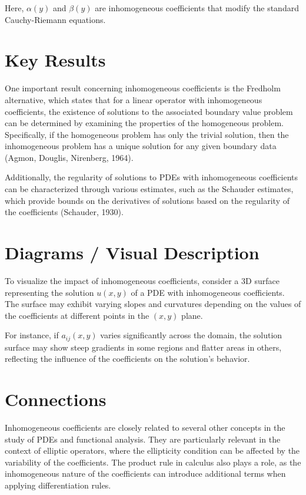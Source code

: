 \documentclass[11pt,a4paper]{article}
\begin{document}
Here, $\alpha(y)$ and $\beta(y)$ are inhomogeneous coefficients that modify the standard Cauchy-Riemann equations.

\section{Key Results}
One important result concerning inhomogeneous coefficients is the Fredholm alternative, which states that for a linear operator with inhomogeneous coefficients, the existence of solutions to the associated boundary value problem can be determined by examining the properties of the homogeneous problem. Specifically, if the homogeneous problem has only the trivial solution, then the inhomogeneous problem has a unique solution for any given boundary data (Agmon, Douglis, Nirenberg, 1964).

Additionally, the regularity of solutions to PDEs with inhomogeneous coefficients can be characterized through various estimates, such as the Schauder estimates, which provide bounds on the derivatives of solutions based on the regularity of the coefficients (Schauder, 1930).

\section{Diagrams / Visual Description}
To visualize the impact of inhomogeneous coefficients, consider a 3D surface representing the solution $u(x,y)$ of a PDE with inhomogeneous coefficients. The surface may exhibit varying slopes and curvatures depending on the values of the coefficients at different points in the $(x,y)$ plane. 

For instance, if $a_{ij}(x,y)$ varies significantly across the domain, the solution surface may show steep gradients in some regions and flatter areas in others, reflecting the influence of the coefficients on the solution's behavior.

\section{Connections}
Inhomogeneous coefficients are closely related to several other concepts in the study of PDEs and functional analysis. They are particularly relevant in the context of elliptic operators, where the ellipticity condition can be affected by the variability of the coefficients. The product rule in calculus also plays a role, as the inhomogeneous nature of the coefficients can introduce additional terms when applying differentiation rules.
\end{document}
